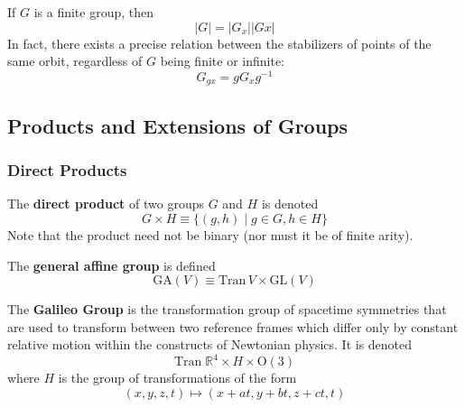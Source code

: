   \begin{corollary}
    If $G$ is a finite group, then 
    \begin{equation}
      |G| = |G_x| |G x|
    \end{equation}
    In fact, there exists a precise relation between the stabilizers of points of the same orbit, regardless of $G$ being finite or infinite: 
    \begin{equation}
      G_{g x} = g G_{x} g^{-1}
    \end{equation}
  \end{corollary}

\subsection{Products and Extensions of Groups} 

\subsubsection{Direct Products}

  \begin{definition}
    The \textbf{direct product} of two groups $G$ and $H$ is denoted
    \begin{equation}
      G \times H \equiv \{ (g, h)\;|\; g \in G, h \in H \}
    \end{equation}
    Note that the product need not be binary (nor must it be of finite arity). 
  \end{definition}

  \begin{example}
    The \textbf{general affine group} is defined 
    \begin{equation}
      \text{GA}(V) \equiv \text{Tran}\,V \times \text{GL}(V)
    \end{equation}
  \end{example}

  \begin{example}
    The \textbf{Galileo Group} is the transformation group of spacetime symmetries that are used to transform between two reference frames which differ only by constant relative motion within the constructs of Newtonian physics. It is denoted 
    \begin{equation}
      \text{Tran}\;\mathbb{R}^{4} \times H \times \text{O} (3)
    \end{equation}
    where $H$ is the group of transformations of the form 
    \begin{equation}
      (x, y, z, t) \longmapsto (x+at, y+bt, z+ct, t)
    \end{equation}
  \end{example}

